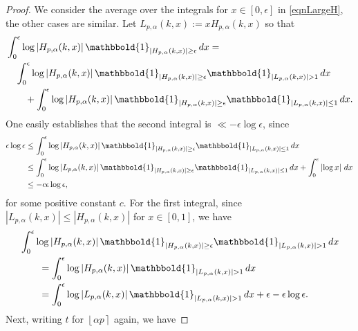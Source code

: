 \documentclass[reqno]{amsart}
\numberwithin{equation}{section}
\numberwithin{table}{section}
\numberwithin{figure}{section}
\newcommand{\abs}[1]{\left\lvert#1\right\rvert}
\newcommand{\round}[1]{\left\lfloor#1\right\rceil}
\begin{document}
\begin{proof}
We consider the average over the integrals for $x\in[0,\epsilon]$ in \eqref{eqnLargeH}, the other cases are similar.
Let $L_{p,\alpha}(k,x) := x H_{p,\alpha}(k,x)$ so that
\begin{equation}\label{eqnHL}
\begin{split}
&\int_0^\epsilon \log\abs{H_{p,\alpha}(k,x)} \mathbbold{1}_{\abs{H_{p,\alpha}(k,x)}\geq\epsilon}\,dx =\\
&\quad
\int_0^\epsilon \log\abs{H_{p,\alpha}(k,x)} \mathbbold{1}_{\abs{H_{p,\alpha}(k,x)}\geq\epsilon} \mathbbold{1}_{\abs{L_{p,\alpha}(k,x)}>1}\,dx\\
&\qquad +
\int_0^\epsilon \log\abs{H_{p,\alpha}(k,x)} \mathbbold{1}_{\abs{H_{p,\alpha}(k,x)}\geq\epsilon} \mathbbold{1}_{\abs{L_{p,\alpha}(k,x)}\leq1}\,dx.
\end{split}
\end{equation}
One easily establishes that the second integral is $\ll -\epsilon\log \epsilon$, since
\begin{equation}\label{eqnHL2}
\begin{split}
\epsilon \log\epsilon
&\leq
\int_0^\epsilon \log\abs{H_{p,\alpha}(k,x)} \mathbbold{1}_{\abs{H_{p,\alpha}(k,x)}\geq\epsilon} \mathbbold{1}_{\abs{L_{p,\alpha}(k,x)}\leq1}\,dx\\
&\leq
\int_0^\epsilon \log\abs{L_{p,\alpha}(k,x)} \mathbbold{1}_{\abs{H_{p,\alpha}(k,x)}\geq\epsilon} \mathbbold{1}_{\abs{L_{p,\alpha}(k,x)}\leq1}\,dx + \int_0^\epsilon \abs{\log x}\,dx\\
&\leq
-c \epsilon\log \epsilon,
\end{split}
\end{equation}
for some positive constant $c$.
For the first integral, since $\abs{L_{p,\alpha}(k,x)}\leq\abs{H_{p,\alpha}(k,x)}$ for $x\in[0,1]$, we have
\begin{equation}\label{eqnHL1}
\begin{split}
&\int_0^\epsilon \log\abs{H_{p,\alpha}(k,x)} \mathbbold{1}_{\abs{H_{p,\alpha}(k,x)}\geq\epsilon} \mathbbold{1}_{\abs{L_{p,\alpha}(k,x)}>1}\,dx\\
&\qquad =
\int_0^\epsilon \log\abs{H_{p,\alpha}(k,x)} \mathbbold{1}_{\abs{L_{p,\alpha}(k,x)}>1}\,dx\\
&\qquad =
\int_0^\epsilon \log\abs{L_{p,\alpha}(k,x)} \mathbbold{1}_{\abs{L_{p,\alpha}(k,x)}>1}\,dx
+ \epsilon - \epsilon\log \epsilon.
\end{split}
\end{equation}
Next, writing $t$ for $\round{\alpha p}$ again, we have

\end{proof}
\end{document}

